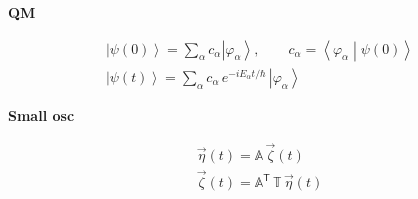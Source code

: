 \documentclass[11pt]{article}
\newcommand{\Tm}{\mathbb{T}}
\newcommand{\Am}{\mathbb{A}}
\providecommand{\ket}[1]{\left|#1\right\rangle}
\providecommand{\braket}[2]{\left\langle #1 \middle| #2 \right\rangle}
\begin{document}
\begin{center}
\begin{minipage}[t]{0.46\textwidth}
\begin{center}\textbf{QM}\end{center}
\begin{gather*}
  \ket{\psi(0)} = \sum_\alpha c_\alpha \ket{\varphi_\alpha},
  \qquad c_\alpha = \braket{\varphi_\alpha}{\psi(0)}\\[4pt]
  \ket{\psi(t)} = \sum_\alpha c_\alpha\, e^{-iE_\alpha t/\hbar}\,\ket{\varphi_\alpha}
\end{gather*}
\end{minipage}\hfill
\begin{minipage}[t]{0.46\textwidth}
\begin{center}\textbf{Small osc}\end{center}
\begin{gather*}
  \vec\eta(t) = \Am\,\vec\zeta(t)\\[4pt]
  \vec\zeta(t) = \Am^{\mathsf T}\,\Tm\,\vec\eta(t)
\end{gather*}
\end{minipage}
\end{center}
\end{document}
